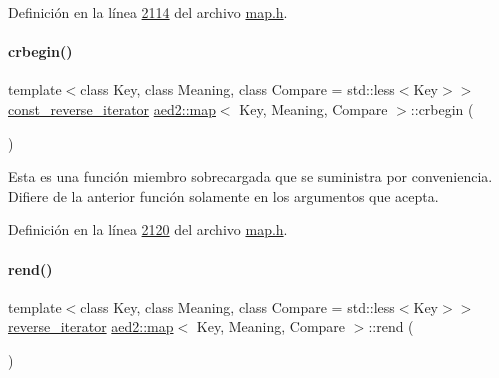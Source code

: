 Definición en la línea \hyperlink{map_8h_source_l02114}{2114} del archivo \hyperlink{map_8h_source}{map.\+h}.

\mbox{\label{classaed2_1_1map_a6ad62765a2b2e00247b9e35a7542b448_a6ad62765a2b2e00247b9e35a7542b448}} 
\paragraph{\texorpdfstring{crbegin()}{crbegin()}}
{\footnotesize\ttfamily template$<$class Key, class Meaning, class Compare = std\+::less$<$\+Key$>$$>$ \\
\hyperlink{classaed2_1_1map_aed66a216549d13078a3ea6978ea0b768_aed66a216549d13078a3ea6978ea0b768}{const\+\_\+reverse\+\_\+iterator} \hyperlink{classaed2_1_1map}{aed2\+::map}$<$ Key, Meaning, Compare $>$\+::crbegin (\begin{DoxyParamCaption}{ }\end{DoxyParamCaption})\hspace{0.3cm}{\ttfamily [inline]}}

Esta es una función miembro sobrecargada que se suministra por conveniencia. Difiere de la anterior función solamente en los argumentos que acepta. 

Definición en la línea \hyperlink{map_8h_source_l02120}{2120} del archivo \hyperlink{map_8h_source}{map.\+h}.

\mbox{\label{classaed2_1_1map_a277f03b4f4b6b98879e4e4921081801f_a277f03b4f4b6b98879e4e4921081801f}} 
\paragraph{\texorpdfstring{rend()}{rend()}\hspace{0.1cm}{\footnotesize\ttfamily [1/2]}}
{\footnotesize\ttfamily template$<$class Key, class Meaning, class Compare = std\+::less$<$\+Key$>$$>$ \\
\hyperlink{classaed2_1_1map_a8e6a592062260177fd73b2f9897b1dd5_a8e6a592062260177fd73b2f9897b1dd5}{reverse\+\_\+iterator} \hyperlink{classaed2_1_1map}{aed2\+::map}$<$ Key, Meaning, Compare $>$\+::rend (\begin{DoxyParamCaption}{ }\end{DoxyParamCaption})\hspace{0.3cm}{\ttfamily [inline]}}



